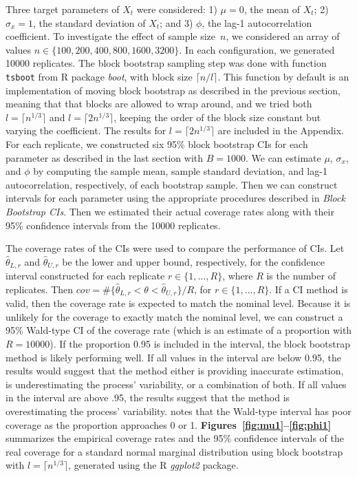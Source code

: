 \documentclass[10pt]{article}
\begin{document}
Three target parameters of $X_t$ were considered:
1) $\mu = 0$, the mean of $X_t$;
2) $\sigma_x = 1$, the standard deviation of $X_t$; and
3) $\phi$, the lag-1 autocorrelation coefficient.
To investigate the effect of sample size~$n$, we considered an array of values
$n \in \{100, 200, 400, 800, 1600, 3200\}$. In each configuration, we generated 
10000 replicates. The 
block bootstrap sampling step was done with function \texttt{tsboot} from R 
package \textsl{boot},\citep{boot} with block size $\lceil n / l \rceil$. This 
function by default is an implementation of moving block bootstrap as described 
in the previous section, meaning that that blocks are allowed to wrap around, 
and we tried both $l = \lceil n^{1/3} \rceil$ and $l = \lceil 2n^{1/3} \rceil$,
keeping the order of the block size constant but varying the coefficient. The
results for $l = \lceil 2n^{1/3} \rceil$ are included in the Appendix.
For each replicate, we constructed 
six 95\% block bootstrap 
CIs for each parameter as described in the last section with $B = 1000$. We can 
estimate $\mu$, 
$\sigma_x$, and $\phi$ by computing the sample mean, sample standard deviation, 
and lag-1 autocorrelation, respectively, of each bootstrap sample. Then we can 
construct intervals for each parameter using the appropriate procedures 
described in \textit{Block Bootstrap CIs}. 
Then we estimated their actual coverage 
rates along with their 95\% confidence intervals from the 10000 replicates. 


The coverage rates of the CIs were used to compare the performance of CIs. Let
$\hat\theta_{L, r}$ and $\hat\theta_{U, r}$ be the lower and upper bound,
respectively, for the confidence interval constructed for each replicate
$r \in \{1, \ldots, R\}$, where $R$ is the number of replicates. Then
$cov = \#\{\hat\theta_{L, r} < \theta < \hat\theta_{U, r} \}/R$, for
$r \in \{1, \ldots, R\}$. If a CI method is valid, then the coverage rate is
expected to match the nominal level. Because it is unlikely for the coverage to 
exactly match the nominal level, we can construct a 95\% Wald-type CI of the 
coverage rate 
(which is an estimate of a proportion with $R = 10000$). If the proportion 0.95 
is included in the interval, the block bootstrap method is likely performing 
well. If all values in the interval are below 0.95, the results would suggest 
that the method either is providing inaccurate estimation, is underestimating 
the process' variability, or a combination of both. If all values in the 
interval are above .95, the results suggest that the method is overestimating 
the process' variability. \citet{brown2001interval} notes that the Wald-type 
interval has poor coverage as the proportion approaches 0 or 1.
\textbf{Figures~\ref{fig:mu1}--\ref{fig:phi1}} 
summarizes the empirical coverage rates and the 95\% confidence intervals of the 
real coverage for a standard normal marginal distribution using block bootstrap
with $l = \lceil n^{1/3} \rceil$, generated using the 
R \textsl{ggplot2} package.\citep{ggplot2}
\end{document}
